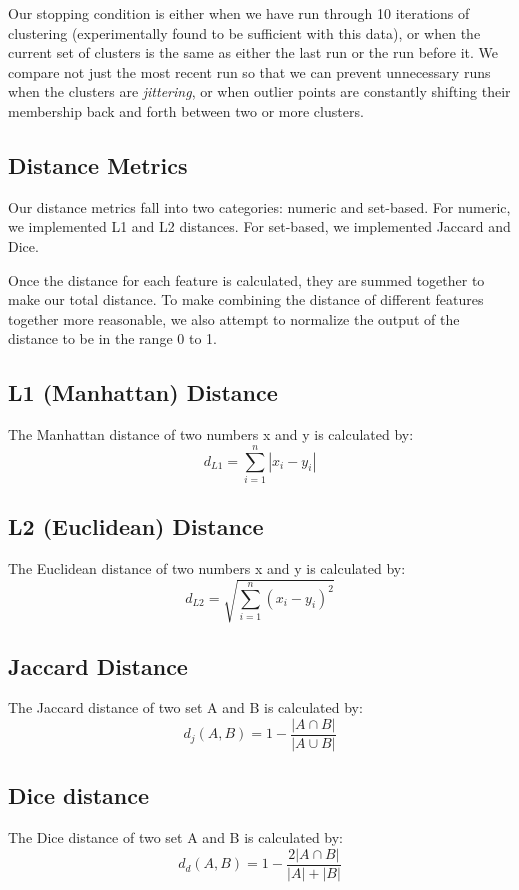 \documentclass{article}
\begin{document}
      Our stopping condition is either when we have run through 10 iterations of clustering (experimentally found to be sufficient with this data),
      or when the current set of clusters is the same as either the last run or the run before it.
      We compare not just the most recent run so that we can prevent unnecessary runs when the clusters are \textit{jittering},
      or when outlier points are constantly shifting their membership back and forth between two or more clusters.

   \subsection{Distance Metrics}
      Our distance metrics fall into two categories: numeric and set-based.
      For numeric, we implemented L1 and L2 distances.
      For set-based, we implemented Jaccard and Dice.

      Once the distance for each feature is calculated, they are summed together to make our total distance.
      To make combining the distance of different features together more reasonable, we also attempt to normalize the output of the distance to be in the range 0 to 1.

      \subsection{L1 (Manhattan) Distance}
         The Manhattan distance of two numbers x and y is calculated by:
         $$ d_{L1} = \sum_{i = 1}^{n} | x_{i} - y_{i} | $$

      \subsection{L2 (Euclidean) Distance}
         The Euclidean distance of two numbers x and y is calculated by:
         $$ d_{L2} = \sqrt{\sum_{i = 1}^{n}(x_{i} - y_{i})^2} $$

      \subsection{Jaccard Distance}
         The Jaccard distance of two set A and B is calculated by:
         $$ d_{j}(A, B) = 1 - \frac{| A \cap B |}{| A \cup B |}$$

      \subsection{Dice distance}
         The Dice distance of two set A and B is calculated by:
         $$d_{d}(A, B) = 1 - \frac{2 | A \cap B |}{|A| + |B|} $$
\end{document}

